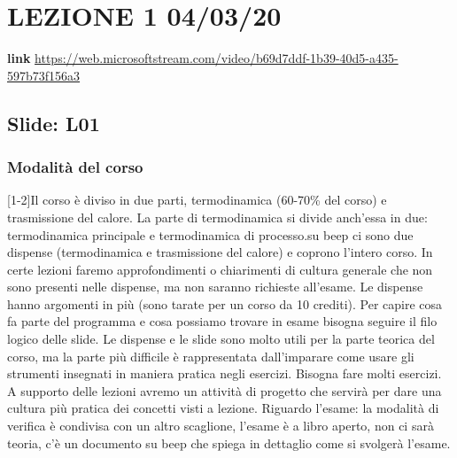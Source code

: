 \section{LEZIONE 1 04/03/20}
\textbf{link} \url{https://web.microsoftstream.com/video/b69d7ddf-1b39-40d5-a435-597b73f156a3}
\subsection{Slide: L01}
\subsubsection{Modalità del corso}
[1-2]\newline
[3] Il corso è diviso in due parti, termodinamica (60-70\% del corso) e trasmissione del calore. La parte di termodinamica si divide anch'essa in due: termodinamica principale e termodinamica di processo.\newline
[4] su beep ci sono due dispense (termodinamica e trasmissione del calore) e coprono l'intero corso. In certe lezioni faremo approfondimenti o chiarimenti di cultura generale che non sono presenti nelle dispense, ma non saranno richieste all'esame. Le dispense hanno argomenti in più (sono tarate per un corso da 10 crediti). Per capire cosa fa parte del programma e cosa possiamo trovare in esame bisogna seguire il filo logico delle slide. Le dispense e le slide sono molto utili per la parte teorica del corso, ma la parte più difficile è rappresentata dall'imparare come usare gli strumenti insegnati in maniera pratica negli esercizi. Bisogna fare molti esercizi. A supporto delle lezioni avremo un attività di progetto che servirà per dare una cultura più pratica dei concetti visti a lezione.\newline
Riguardo l'esame: la modalità di verifica è condivisa con un altro scaglione, l'esame è a libro aperto, non ci sarà teoria, c'è un documento su beep che spiega in dettaglio come si svolgerà l'esame.

